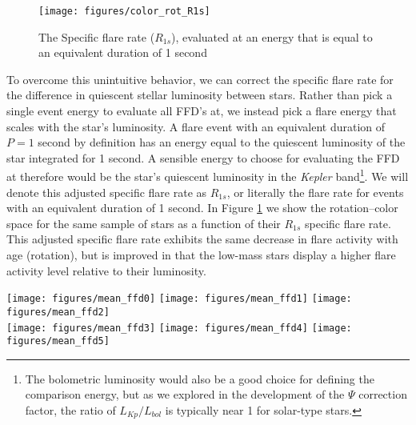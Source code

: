 \documentclass[preprint2]{aastex62}
\newcommand{\Kepler}{\textsl{Kepler}\xspace}
\begin{document}
\begin{figure}[!t]
\centering
\texttt{[image: figures/color\_rot\_R1s]}
\caption{
The Specific flare rate ($R_{1s}$), evaluated at an energy that is equal to an equivalent duration of 1 second
}
\label{fig:R1s}
\end{figure}





To overcome this unintuitive behavior, we can correct the specific flare rate for the difference in quiescent stellar luminosity between stars. Rather than pick a single event energy to evaluate all FFD's at, we instead pick a flare energy that scales with the star's luminosity. A flare event with an equivalent duration of $P=1$ second by definition has an energy equal to the quiescent luminosity of the star integrated for 1 second. A sensible energy to choose for evaluating the FFD at therefore would be the star's quiescent luminosity in the \Kepler band\footnote{The bolometric luminosity would also be a good choice for defining the comparison energy, but as we explored in the development of the $\Psi$ correction factor, the ratio of $L_{Kp}/L_{bol}$ is typically near 1 for solar-type stars.}. We will denote this adjusted specific flare rate as $R_{1s}$, or literally the flare rate for events with an equivalent duration of 1 second. In Figure \ref{fig:R1s} we show the rotation--color space for the same sample of stars as a function of their $R_{1s}$ specific flare rate. This adjusted specific flare rate exhibits the same decrease in flare activity with age (rotation), but is improved in that the low-mass stars display a higher flare activity level relative to their luminosity.









\begin{figure*}[!ht]
\centering
\texttt{[image: figures/mean\_ffd0]}
\texttt{[image: figures/mean\_ffd1]}
\texttt{[image: figures/mean\_ffd2]}\\
\texttt{[image: figures/mean\_ffd3]}
\texttt{[image: figures/mean\_ffd4]}
\texttt{[image: figures/mean\_ffd5]}
\caption{
Average FFD, combining all available quarters of \Kepler data, for stars in the 6 $g-i$ color bins defined in \citet{davenport2016}. Each track is colored as a function of the measured rotation period from \citet{mcquillan2014}. A clear and coherent decrease in the total flare rates is observed as stars slow down (age) within each panel.
}
\label{fig:meanffd}
\end{figure*}
\end{document}
